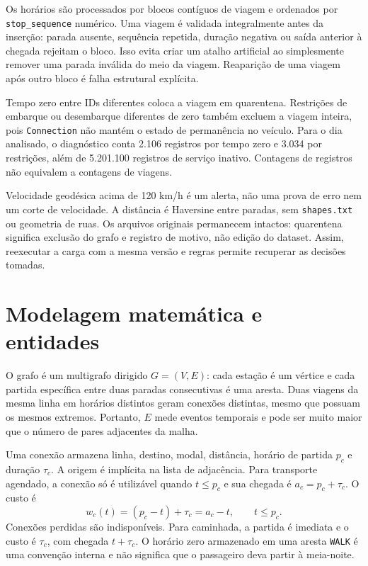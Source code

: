 \documentclass[12pt]{article}
\newcommand{\code}[1]{\texttt{#1}}
\begin{document}
Os horários são processados por blocos contíguos de viagem e ordenados por \code{stop\_sequence} numérico. Uma viagem é validada integralmente antes da inserção: parada ausente, sequência repetida, duração negativa ou saída anterior à chegada rejeitam o bloco. Isso evita criar um atalho artificial ao simplesmente remover uma parada inválida do meio da viagem. Reaparição de uma viagem após outro bloco é falha estrutural explícita.

Tempo zero entre IDs diferentes coloca a viagem em quarentena. Restrições de embarque ou desembarque diferentes de zero também excluem a viagem inteira, pois \code{Connection} não mantém o estado de permanência no veículo. Para o dia analisado, o diagnóstico conta 2.106 registros por tempo zero e 3.034 por restrições, além de 5.201.100 registros de serviço inativo. Contagens de registros não equivalem a contagens de viagens.

Velocidade geodésica acima de 120 km/h é um alerta, não uma prova de erro nem um corte de velocidade. A distância é Haversine entre paradas, sem \code{shapes.txt} ou geometria de ruas. Os arquivos originais permanecem intactos: quarentena significa exclusão do grafo e registro de motivo, não edição do dataset. Assim, reexecutar a carga com a mesma versão e regras permite recuperar as decisões tomadas.

\section{Modelagem matemática e entidades}
O grafo é um multigrafo dirigido $G=(V,E)$: cada estação é um vértice e cada partida específica entre duas paradas consecutivas é uma aresta. Duas viagens da mesma linha em horários distintos geram conexões distintas, mesmo que possuam os mesmos extremos. Portanto, $E$ mede eventos temporais e pode ser muito maior que o número de pares adjacentes da malha.

Uma conexão armazena linha, destino, modal, distância, horário de partida $p_c$ e duração $\tau_c$. A origem é implícita na lista de adjacência. Para transporte agendado, a conexão só é utilizável quando $t\leq p_c$ e sua chegada é $a_c=p_c+\tau_c$. O custo é
\begin{equation}
w_c(t)=(p_c-t)+\tau_c=a_c-t,\qquad t\leq p_c.
\end{equation}
Conexões perdidas são indisponíveis. Para caminhada, a partida é imediata e o custo é $\tau_c$, com chegada $t+\tau_c$. O horário zero armazenado em uma aresta \code{WALK} é uma convenção interna e não significa que o passageiro deva partir à meia-noite.
\end{document}
